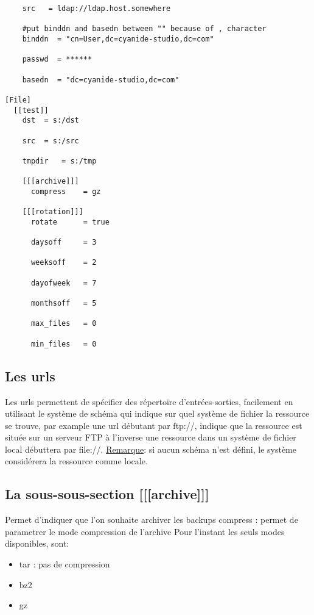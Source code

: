 \begin{verbatim}
    src   = ldap://ldap.host.somewhere

    #put binddn and basedn between "" because of , character
    binddn  = "cn=User,dc=cyanide-studio,dc=com"

    passwd  = ******

    basedn  = "dc=cyanide-studio,dc=com"
  
[File]
  [[test]]
    dst  = s:/dst

    src  = s:/src

    tmpdir   = s:/tmp

    [[[archive]]]
      compress    = gz

    [[[rotation]]]
      rotate      = true

      daysoff     = 3

      weeksoff    = 2

      dayofweek   = 7

      monthsoff   = 5

      max_files   = 0

      min_files   = 0	
\end{verbatim}

\subsection*{Les urls}
Les urls permettent de spécifier des répertoire d'entrées-sorties, facilement en utilisant le système de schéma qui indique sur quel système de fichier la ressource se trouve, par example une url débutant par ftp://, indique que la ressource est située sur un serveur FTP à l'inverse une ressource dans un système de fichier local débuttera par file://.
\underline{Remarque}: si aucun schéma n'est défini, le système considérera la ressource comme locale.


\subsection*{La sous-sous-section [[[archive]]]}
Permet d'indiquer que l'on souhaite archiver les backups
compress : permet de parametrer le mode compression de l'archive
Pour l'instant les seuls modes disponibles, sont:
\begin{itemize}
\item tar : pas de compression
\item bz2
\item gz 
\end{itemize}



